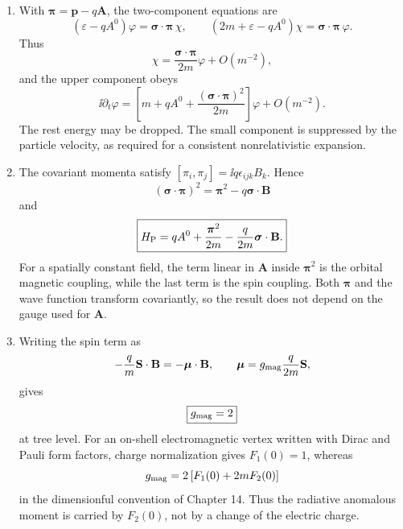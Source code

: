 
\begin{enumerate}
\begin{enumerate}
\item
With \(\boldsymbol\pi=\mathbf p-q\mathbf A\), the two-component equations are
\[
 (\varepsilon-qA^0)\varphi=\boldsymbol\sigma\cdot\boldsymbol\pi\,\chi,
 \qquad
 (2m+\varepsilon-qA^0)\chi
 =\boldsymbol\sigma\cdot\boldsymbol\pi\,\varphi .
\]
Thus
\[
 \chi=\frac{\boldsymbol\sigma\cdot\boldsymbol\pi}{2m}\varphi
 +O(m^{-2}),
\]
and the upper component obeys
\[
 \ii\partial_t\varphi=
 \left[m+qA^0+
 \frac{(\boldsymbol\sigma\cdot\boldsymbol\pi)^2}{2m}\right]\varphi
 +O(m^{-2}).
\]
The rest energy may be dropped.  The small component is suppressed by the
particle velocity, as required for a consistent nonrelativistic expansion.
\item
The covariant momenta satisfy
\([\pi_i,\pi_j]=\ii q\epsilon_{ijk}B_k\).  Hence
\[
 (\boldsymbol\sigma\cdot\boldsymbol\pi)^2
 =\boldsymbol\pi^2-q\boldsymbol\sigma\cdot\mathbf B
\]
and
\[
 \boxed{H_{\rm P}=qA^0+\frac{\boldsymbol\pi^2}{2m}
 -\frac{q}{2m}\boldsymbol\sigma\cdot\mathbf B .}
\]
For a spatially constant field, the term linear in \(\mathbf A\) inside
\(\boldsymbol\pi^2\) is the orbital magnetic coupling, while the last term
is the spin coupling.  Both \(\boldsymbol\pi\) and the wave function
transform covariantly, so the result does not depend on the gauge used for
\(\mathbf A\).
\item
Writing the spin term as
\[
 -\frac{q}{m}\mathbf S\cdot\mathbf B
 =-\boldsymbol\mu\cdot\mathbf B,\qquad
 \boldsymbol\mu=g_{\rm mag}\frac{q}{2m}\mathbf S,
\]
gives
\[
 \boxed{g_{\rm mag}=2}
\]
at tree level.  For an on-shell electromagnetic vertex written with Dirac
and Pauli form factors, charge normalization gives \(F_1(0)=1\), whereas
\[
 g_{\rm mag}=2\,[F_1(0)+2mF_2(0)]
\]
in the dimensionful convention of Chapter 14.  Thus the radiative
anomalous moment is carried by \(F_2(0)\), not by a change of the electric
charge.
\end{enumerate}


\end{enumerate}
